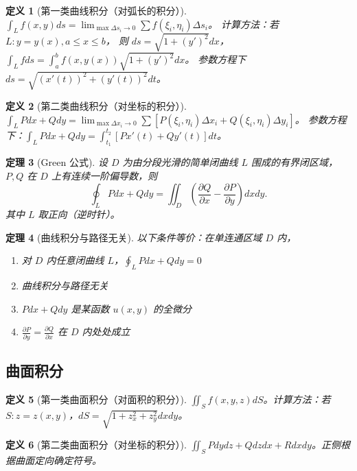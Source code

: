 \documentclass[12pt,a4paper]{ctexart}
\newtheorem{theorem}{定理}[section]
\newtheorem{definition}[theorem]{定义}
\theoremstyle{remark}
\begin{document}
\begin{definition}[第一类曲线积分（对弧长的积分）]
$\int_L f(x,y) ds = \lim_{\max \Delta s_i \to 0} \sum f(\xi_i,\eta_i) \Delta s_i$。
计算方法：若 $L: y=y(x), a\le x\le b$，
则 $ds = \sqrt{1+(y')^2}dx$，$\int_L f ds = \int_a^b f(x,y(x))\sqrt{1+(y')^2}dx$。
参数方程下 $ds = \sqrt{(x'(t))^2+(y'(t))^2} dt$。
\end{definition}

\begin{definition}[第二类曲线积分（对坐标的积分）]
$\int_L Pdx + Qdy = \lim_{\max\Delta x_i\to 0} \sum [P(\xi_i,\eta_i)\Delta x_i + Q(\xi_i,\eta_i)\Delta y_i]$。
参数方程下：$\int_L Pdx+Qdy = \int_{t_1}^{t_2} [P x'(t) + Q y'(t)] dt$。
\end{definition}

\begin{theorem}[Green 公式]
设 $D$ 为由分段光滑的简单闭曲线 $L$ 围成的有界闭区域，$P,Q$ 在 $D$ 上有连续一阶偏导数，则
\[
\oint_L Pdx + Qdy = \iint_D \left(\frac{\partial Q}{\partial x} - \frac{\partial P}{\partial y}\right) dxdy.
\]
其中 $L$ 取正向（逆时针）。
\end{theorem}

\begin{theorem}[曲线积分与路径无关]
以下条件等价：在单连通区域 $D$ 内，
\begin{enumerate}
  \item 对 $D$ 内任意闭曲线 $L$，$\oint_L Pdx+Qdy=0$
  \item 曲线积分与路径无关
  \item $Pdx+Qdy$ 是某函数 $u(x,y)$ 的全微分
  \item $\frac{\partial P}{\partial y} = \frac{\partial Q}{\partial x}$ 在 $D$ 内处处成立
\end{enumerate}
\end{theorem}

\subsection{曲面积分}

\begin{definition}[第一类曲面积分（对面积的积分）]
$\iint_S f(x,y,z) dS$。计算方法：若 $S: z = z(x,y)$，$dS = \sqrt{1+z_x^2+z_y^2}dxdy$。
\end{definition}

\begin{definition}[第二类曲面积分（对坐标的积分）]
$\iint_S P dydz + Q dzdx + R dxdy$。正侧根据曲面定向确定符号。
\end{definition}
\end{document}
